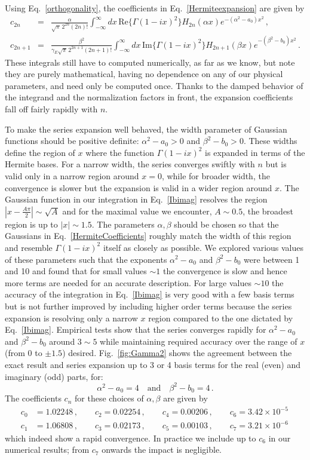 \documentclass[a4,letterpaper,11pt]{article}
\newcommand{\nn}{\nonumber}
\newcommand{\be}{\begin{equation}}
\newcommand{\ee}{\end{equation}}
\newcommand{\bea}{\begin{eqnarray}}
\newcommand{\eea}{\end{eqnarray}}
\newcommand{\eq}[1]{Eq.~\eqref{#1}}
\newcommand{\fig}[1]{Fig.~\ref{fig:#1}}
\begin{document}
Using \eq{orthogonality}, the coefficients in \eq{Hermiteexpansion} are given by
\bea
\label{HermiteCoefficients}
c_{2n} &=& \frac{\alpha}{\sqrt{\pi}\, 2^{2n} (2n)!} \int_{-\infty}^\infty dx \, \text{Re}\{\Gamma(1-ix)^2\} H_{2n}(\alpha x) e^{-(\alpha^2-a_0) x^2}\,,
\\
c_{2n+1} &=& \frac{\beta^2}{\gamma_E \sqrt{\pi}\, 2^{2n+1} (2n+1)!} 
\int_{-\infty}^\infty dx \, \text{Im}\{\Gamma(1-ix)^2\} H_{2n+1}(\beta x) e^{-(\beta^2-b_0) x^2}\,.\nn
\eea
These integrals still have to computed numerically, as far as we know, but note they are purely mathematical, having no dependence on any of our physical parameters, and need only be computed once.
Thanks to the damped behavior of the integrand and the normalization factors in front, the expansion coefficients fall off fairly rapidly with $n$. 

To make the series expansion well behaved, the width parameter of Gaussian functions should be positive definite: $\alpha^2- a_0>0$ and $\beta^2- b_0>0$. These widths define the region of $x$ where the function $\Gamma(1-ix)^2$ is expanded in terms of the Hermite bases. For a narrow width, the series converges swiftly with $n$ but is valid only in a narrow region around $x=0$, while for broader width, the convergence is slower but the expansion is valid in a wider region around $x$. The Gaussian function in our integration in \eq{Ibimag} resolves the region $|x-\tfrac{A\pi}{2}| \sim \sqrt{A}$ and for the maximal value we encounter, $A\sim 0.5$, the broadest region is up to $|x| \sim 1.5$. The parameters $\alpha,\beta$ should be chosen so that the Gaussians in \eq{HermiteCoefficients} roughly match the width of this region and resemble $\Gamma(1-ix)^2$ itself as closely as possible. We explored various values of these parameters such that the exponents $\alpha^2 -a_0$ and $\beta^2-b_0$ were between 1 and 10 and found that for small values $\sim 1$ the convergence is slow and hence  more terms are needed for an accurate description. For large values $\sim 10$ the accuracy of the integration in \eq{Ibimag} is very good with a few basis terms but is not further improved by including higher order terms  because the series expansion is resolving only a narrow $x$ region compared to the one dictated by \eq{Ibimag}.
Empirical tests show that the series converges rapidly for $\alpha^2-a_0$ and $\beta^2-b_0$ around $3\sim 5$ while maintaining  required accuracy over the range of $x$ (from 0 to $\pm 1.5 $) desired.
\fig{Gamma2} shows the agreement between the exact result and series expansion up to 3 or 4 basis terms for the real (even) and imaginary (odd) parts, for:
\be\label{alphabeta}
\alpha^2-a_0=4\quad \text{and}\quad \beta^2-b_0=4\,.
\ee  
The coefficients $c_{n}$ for these choices of $\alpha,\beta$ are given by
\begin{align}
\label{cn}
c_0& =1.02248\,,\qquad c_2 = 0.02254\,,\qquad c_4= 0.00206\,, \qquad c_6=3.42\times 10^{-5}
\\ 
c_1&=1.06808\,,\qquad c_3=0.02173\,,\qquad c_5=0.00103\,, \qquad c_7=3.21 \times10^{-6}\, \nn
\end{align}
which indeed show a rapid convergence. In practice we include up to $c_6$ in our numerical results; from $c_7$ onwards the impact is negligible.
\end{document}
